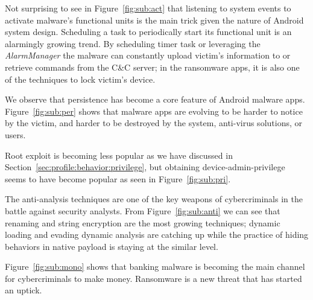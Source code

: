 Not surprising to see in Figure~\ref{fig:sub:act} that listening to system events to
activate malware's functional units is the main trick given the nature of Android system design.
Scheduling a task to periodically start its functional unit is an alarmingly growing trend.
By scheduling timer task or leveraging the {\em AlarmManager} the malware can constantly
upload victim's information to or retrieve commands from the C\&C server;
in the ransomware apps, it is also one of the techniques to lock victim's device.

We observe that persistence has become a core feature of Android malware apps. 
Figure~\ref{fig:sub:per} shows that malware apps are evolving to be harder 
to notice by the victim, %
and harder to be destroyed by the system,
anti-virus solutions, or users.

Root exploit is becoming less popular as we have discussed in Section~\ref{sec:profile:behavior:privilege},
but obtaining device-admin-privilege seems to have become popular as seen in Figure~\ref{fig:sub:pri}.

The anti-analysis techniques are one of the key weapons of cybercriminals in 
the battle against security analysts.
From Figure~\ref{fig:sub:anti} we can see that renaming and string encryption
are the most growing techniques;
dynamic loading and evading dynamic analysis are catching up while
the practice of hiding behaviors in native payload is staying at the similar level.

Figure~\ref{fig:sub:mono} shows that banking malware is becoming the 
main channel for cybercriminals to make money.
Ransomware is a new threat that has started an uptick.

